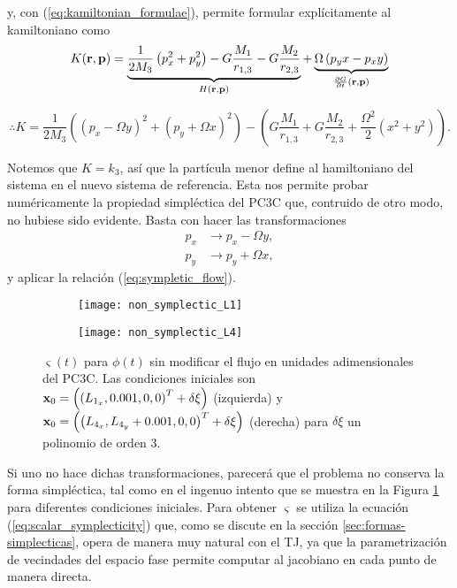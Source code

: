 y, con (\ref{eq:kamiltonian_formulae}), permite formular explícitamente al kamiltoniano como
\begin{equation*}
 K(\mathbf{r}, \mathbf{p}) = \underbrace{ \frac{1}{2M_3}\left( p_x^2 + p_y^2 \right) - G \frac{M_1}{r_{1,3}} - G \frac{M_2}{r_{2,3}}}_{H(\mathbf{r}, \mathbf{p}) } + \underbrace{\Omega\left( p_y x - p_x y \right) }_{\frac{\partial G}{\partial t}(\mathbf{r}, \mathbf{p})}
\end{equation*}

\begin{equation}
 \therefore K = \frac{1}{2M_3} \left( (p_x - \Omega y)^2 + (p_y + \Omega x)^2 \right) - \left(G \frac{M_1}{r_{1,3}} + G \frac{M_2}{r_{2,3}} + \frac{\Omega^2}{2}\left( x^2 + y^2 \right) \right).
 \label{eq:kamiltonian}
\end{equation}

Notemos que $K = k_3$, así que la partícula menor define al hamiltoniano del sistema en el nuevo sistema de referencia. Esta nos permite probar numéricamente la propiedad simpléctica del PC3C que, contruido de otro modo, no hubiese sido evidente. Basta con hacer las transformaciones 
\begin{align}
p_x &\to p_x - \Omega y, \\
p_y &\to p_y + \Omega x,
\label{eq:momentum_transformation}
\end{align} 
y aplicar la relación (\ref{eq:sympletic_flow}).

\begin{figure}[h!]
\centering
\begin{subfigure}{0.49\textwidth}
	\centering
	\texttt{[image: non\_symplectic\_L1]}
\end{subfigure}
%
\begin{subfigure}{0.49\textwidth}
	\centering
	\texttt{[image: non\_symplectic\_L4]}
\end{subfigure}
\caption{ $\varsigma(t)$ para $\phi(t)$ sin modificar el flujo en unidades adimensionales del PC3C. Las condiciones iniciales son $\mathbf{x}_0 = \left( \left( L_{1_x}, 0.001, 0, 0 \right)^T + \delta \xi \right) $ (izquierda) y $ \mathbf{x}_0 = \left( \left( L_{4_x}, L_{4_y} + 0.001, 0, 0 \right)^T + \delta \xi \right) $ (derecha) para $\delta \xi$ un polinomio de orden $3$.}
\label{fig:non_symplectic_L4_L1}
\end{figure}

Si uno no hace dichas transformaciones, parecerá que el problema no conserva la forma simpléctica, tal como en el ingenuo intento que se muestra en la Figura \ref{fig:non_symplectic_L4_L1} para diferentes condiciones iniciales. Para obtener $\varsigma$ se utiliza la ecuación (\ref{eq:scalar_symplecticity}) que, como se discute en la sección \ref{sec:formas-simplecticas}, opera de manera muy natural con el TJ, ya que la parametrización de vecindades del espacio fase permite computar al jacobiano en cada punto de manera directa.


